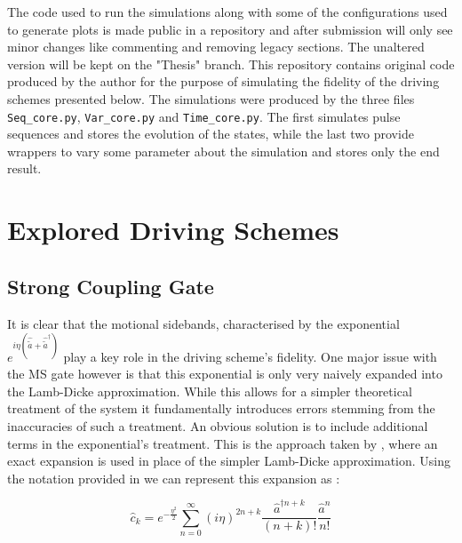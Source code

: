 \documentclass[12pt,twoside]{report}
\begin{document}
The code used to run the simulations along with some of the configurations used to generate plots is made public in a repository \cite{Github} and after submission will only see minor changes like commenting and removing legacy sections. The unaltered version will be kept on the "Thesis" branch. This repository contains original code produced by the author for the purpose of simulating the fidelity of the driving schemes presented below. The simulations were produced by the three files \texttt{Seq\_core.py}, \texttt{Var\_core.py} and \texttt{Time\_core.py}. The first simulates pulse sequences and stores the evolution of the states, while the last two provide wrappers to vary some parameter about the simulation and stores only the end result.

\chapter{Explored Driving Schemes}
\label{Driving_schemes}

\section{Strong Coupling Gate}
\label{Driving_schemes:SC}

It is clear that the motional sidebands, characterised by the exponential ${e^{i\eta\left(\hat{\tilde{a}}+\hat{\tilde{a}}^\dagger\right)}}$ play a key role in the driving scheme's fidelity. One major issue with the MS gate however is that this exponential is only very naively expanded into the Lamb-Dicke approximation\cite{Fast_MS}. While this allows for a simpler theoretical treatment of the system it fundamentally introduces errors stemming from the inaccuracies of such a treatment. An obvious solution is to include additional terms in the exponential's treatment. This is the approach taken by \cite{SC_Paper}, where an exact expansion is used in place of the simpler Lamb-Dicke approximation. Using the notation provided in  we can represent this expansion as \cite{SC_Paper}:

\begin{equation}
	\hat{c}_k = e^{-\frac{\eta^2}{2}}\sum_{n=0}^\infty \left(i\eta\right)^{2n+k}\frac{\hat{a}^{\dagger n+k}}{\left(n+k\right)!}\frac{\hat{a}^{n}}{n!}
	\label{eq:SC_expansion}
\end{equation}
\end{document}
